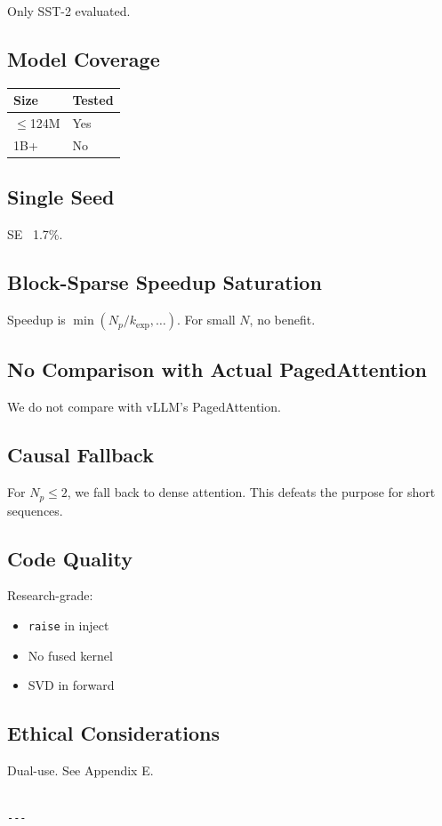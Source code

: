 Only SST-2 evaluated.

\subsection{Model Coverage}

\begin{table}[H]
\centering
\small
\begin{tabular}{ll}
\toprule
\textbf{Size} & \textbf{Tested} \\
\midrule
$\le$124M & Yes \\
1B+ & No \\
\bottomrule
\end{tabular}
\end{table}

\subsection{Single Seed}

SE ~1.7\%.

\subsection{Block-Sparse Speedup Saturation}

Speedup is $\min(N_p/k_\text{exp}, \ldots)$. For small $N$, no benefit.

\subsection{No Comparison with Actual PagedAttention}

We do not compare with vLLM's PagedAttention.

\subsection{Causal Fallback}

For $N_p \leq 2$, we fall back to dense attention. This defeats the purpose 
for short sequences.

\subsection{Code Quality}

Research-grade:
\begin{itemize}
\item \texttt{raise} in inject
\item No fused kernel
\item SVD in forward

\end{itemize}
\subsection{Ethical Considerations}

Dual-use. See Appendix E.
\begin{lstlisting}

---
\end{lstlisting}